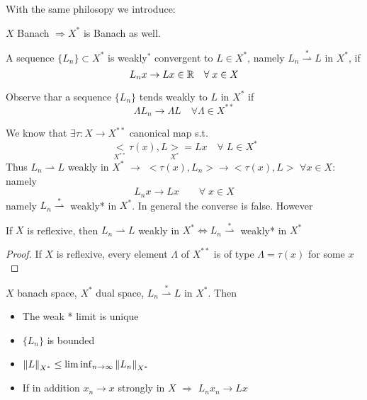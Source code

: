 With the same philosopy we introduce: 
\begin{definition}
    \(X \) Banach \(\Rightarrow X^* \) is Banach as well.
\end{definition}
\begin{definition}
    A sequence \(\{L_n \} \subset X^*\) is weakly\(^*\) convergent to \(L \in  X^*\), namely \(L_n \overset{*}{\rightharpoonup} L\) in \(X^*\), if 
    \[
        L_n x \to Lx \in \mathbb{R} \quad \forall\; x \in X
    \]
\end{definition}
\begin{remark}
    Observe thar a sequence \(\{L_n\} \) tends weakly to \(L\) in \(X^*\) if 
    \[
        \Lambda L_n \to \Lambda L \quad \forall \Lambda \in X^{**}
    \]
\end{remark}
We know that \(\exists \tau:X \to X^{**}\) canonical map s.t. 
    \[
        \underset{X^{**}}{<}\tau(x), L \underset{X^*}{>} = Lx \quad \forall \; L \in X^*
    \]
    Thus \(L_n \rightharpoonup L\) weakly in \(X^*\) \(\rightarrow\) \(<\tau(x), L_n> \to <\tau(x), L>\) \(\forall x \in X:\) namely
    \[
        L_n x \to Lx \qquad \forall \; x \in X
    \]
    namely \(L_n \overset{*}{\rightharpoonup}\) weakly* in \(X^*\). In general the converse is false. However
    \begin{proposition}
        If \(X\) is reflexive, then \(L_n \rightharpoonup L\) weakly in \(X^* \iff L_n \overset{*}{\rightharpoonup}\) weakly* in \(X^*\)
    \end{proposition}
    \begin{proof}
        If \(X\) is reflexive, every element \(\Lambda\) of \(X^{**}\) is of type \(\Lambda = \tau(x)\) for some \(x\)
    \end{proof}
    \begin{proposition}
        \(X\) banach space, \(X^*\) dual space, \(L_n \overset{*}{\rightharpoonup} L\) in \(X^*\). Then
        \begin{itemize}
            \item The weak * limit is unique
            \item \(\{L_n\}\) is bounded
            \item \(\norm{L}_{X^*} \leq \liminf _{n \to \infty} \norm{L_n}_{X^*}\)
            \item If in addition \(x_n \to x\) strongly in \(X\) \(\Rightarrow\) \(L_nx_n \to Lx\) 
        \end{itemize}
    \end{proposition}

